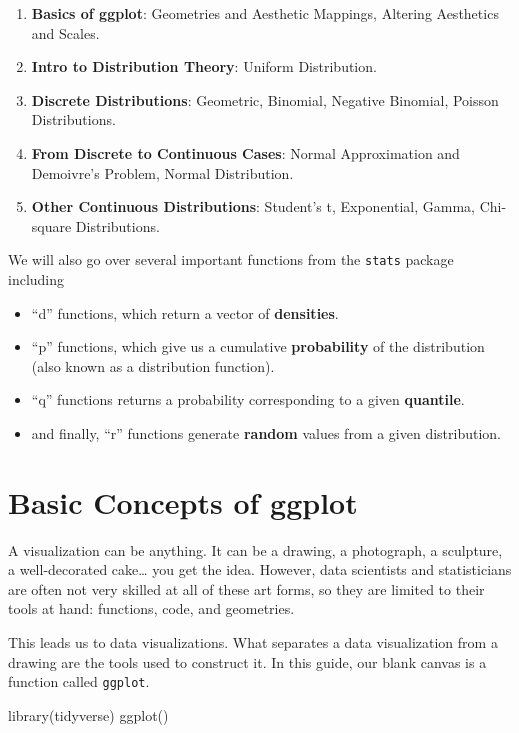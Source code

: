 \documentclass[
]{article}
\newenvironment{Shaded}{\begin{snugshade}}{\end{snugshade}}
\newcommand{\FunctionTok}[1]{\textcolor[rgb]{0.00,0.00,0.00}{#1}}
\newcommand{\NormalTok}[1]{#1}
\begin{document}
\begin{enumerate}
\def\labelenumi{\arabic{enumi}.}
\item
  \textbf{Basics of ggplot}: Geometries and Aesthetic Mappings, Altering Aesthetics and Scales.
\item
  \textbf{Intro to Distribution Theory}: Uniform Distribution.
\item
  \textbf{Discrete Distributions}: Geometric, Binomial, Negative Binomial, Poisson Distributions.
\item
  \textbf{From Discrete to Continuous Cases}: Normal Approximation and Demoivre's Problem, Normal Distribution.
\item
  \textbf{Other Continuous Distributions}: Student's t, Exponential, Gamma, Chi-square Distributions.
\end{enumerate}

We will also go over several important functions from the \texttt{stats} package including

\begin{itemize}
\item
  ``d'' functions, which return a vector of \textbf{densities}.
\item
  ``p'' functions, which give us a cumulative \textbf{probability} of the distribution (also known as a distribution function).
\item
  ``q'' functions returns a probability corresponding to a given \textbf{quantile}.
\item
  and finally, ``r'' functions generate \textbf{random} values from a given distribution.
\end{itemize}

\hypertarget{ggplot}{%
\section{Basic Concepts of ggplot}\label{ggplot}}

A visualization can be anything. It can be a drawing, a photograph, a sculpture, a well-decorated cake\ldots{} you get the idea. However, data scientists and statisticians are often not very skilled at all of these art forms, so they are limited to their tools at hand: functions, code, and geometries.

This leads us to data visualizations. What separates a data visualization from a drawing are the tools used to construct it. In this guide, our blank canvas is a function called \texttt{ggplot}.

\begin{Shaded}
\begin{Highlighting}[]
\FunctionTok{library}\NormalTok{(tidyverse)}
\FunctionTok{ggplot}\NormalTok{()}
\end{Highlighting}
\end{Shaded}
\end{document}
